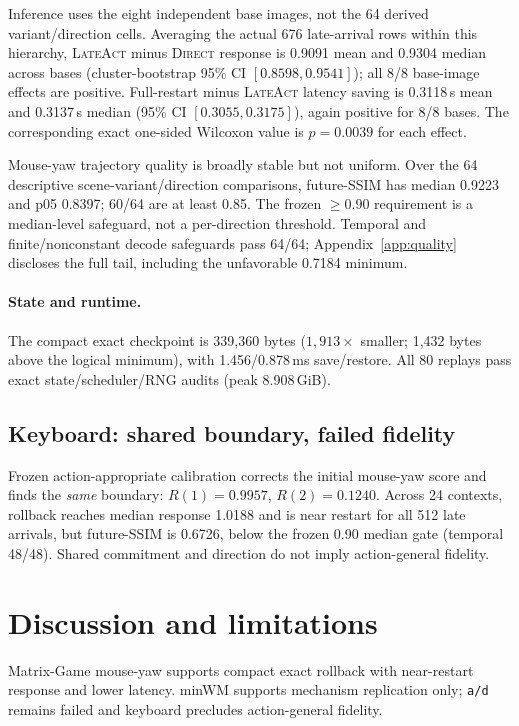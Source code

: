 \documentclass{article}
\newcommand{\method}{\textsc{LateAct}}
\newcommand{\direct}{\textsc{Direct}}
\begin{document}
Inference uses the eight independent base images, not the 64 derived
variant/direction cells. Averaging the actual 676 late-arrival rows within this
hierarchy, \method{} minus \direct{} response is 0.9091 mean and 0.9304 median
across bases (cluster-bootstrap 95\% CI $[0.8598,0.9541]$); all 8/8 base-image
effects are positive. Full-restart minus \method{} latency saving is
0.3118\,s mean and 0.3137\,s median (95\% CI $[0.3055,0.3175]$), again positive
for 8/8 bases. The corresponding exact one-sided Wilcoxon value is
$p=0.0039$ for each effect.

Mouse-yaw trajectory quality is broadly stable but not uniform. Over the 64
descriptive scene-variant/direction comparisons, future-SSIM has median 0.9223
and p05 0.8397; 60/64 are at least 0.85. The frozen $\geq0.90$ requirement is
a median-level safeguard, not a per-direction threshold. Temporal and
finite/nonconstant decode safeguards pass 64/64; Appendix~\ref{app:quality}
discloses the full tail, including the unfavorable 0.7184 minimum.

\paragraph{State and runtime.}
The compact exact checkpoint is 339,360 bytes ($1{,}913\times$ smaller; 1,432
bytes above the logical minimum), with 1.456/0.878\,ms save/restore. All 80
replays pass exact state/scheduler/RNG audits (peak 8.908\,GiB).

\subsection{Keyboard: shared boundary, failed fidelity}

Frozen action-appropriate calibration corrects the initial mouse-yaw score and
finds the \emph{same} boundary: $R(1)=0.9957$, $R(2)=0.1240$. Across 24
contexts, rollback reaches median response 1.0188 and is near restart for all
512 late arrivals, but future-SSIM is 0.6726, below the frozen 0.90 median gate
(temporal 48/48). Shared commitment and direction do not imply action-general
fidelity.

\section{Discussion and limitations}
\label{sec:discussion}

Matrix-Game mouse-yaw supports compact exact rollback with near-restart
response and lower latency. minWM supports mechanism replication only;
\texttt{a/d} remains failed and keyboard precludes action-general fidelity.
\end{document}
